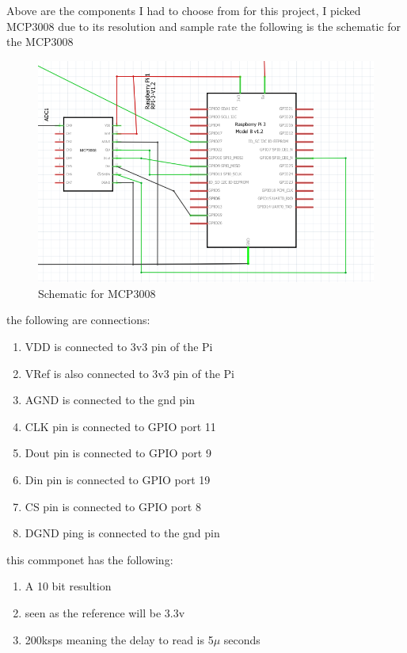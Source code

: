 Above are the components I had to choose from 
for this project, I picked  MCP3008 due to its  resolution and  sample rate
the following is the   schematic for the  MCP3008\cite{ada}
\begin{figure}[h!]
	\centering
	\includegraphics[width=0.5\linewidth]{Images/SchematicforMCP300.png}
	\caption{Schematic for  MCP3008}
	\label{Schematic for  MCP3008}
\end{figure}
the following are connections:
\begin{enumerate}
	\item VDD is connected to 3v3 pin of the  Pi
	\item VRef is  also connected to  3v3 pin of the  Pi
	\item AGND is connected to the gnd pin 
	\item CLK pin is connected to GPIO port 11
	\item Dout pin is connected to GPIO port 9
	\item Din pin is connected to GPIO port 19
	\item CS pin  is connected  to GPIO port 8
	\item DGND ping is connected to the gnd pin
\end{enumerate}
this  commponet has the following:
\begin{enumerate}
	\item A 10 bit resultion
	\item seen as  the  reference  will  be 3.3v  
	\item 200ksps meaning the delay to read is 5$\mu$ seconds
\end{enumerate}
